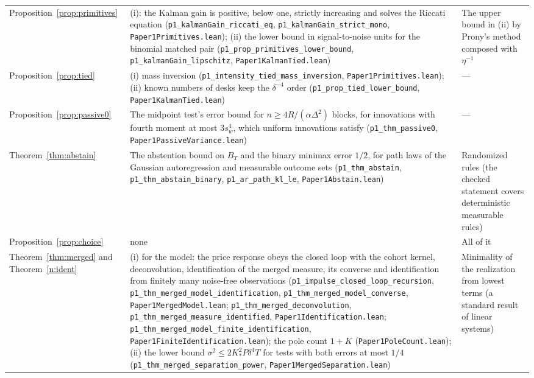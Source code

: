 \documentclass[12pt]{article}
\theoremstyle{definition}
\theoremstyle{remark}
\begin{document}
\begin{longtable}{>{\raggedright\arraybackslash}p{}>{\raggedright\arraybackslash}p{}>{\raggedright\arraybackslash}p{}}
Proposition~\ref{prop:primitives} & (i): the Kalman gain is positive, below one, strictly increasing and solves the Riccati equation (\texttt{p1\_kalmanGain\_riccati\_eq}, \nolinkurl{p1_kalmanGain_strict_mono}, \nolinkurl{Paper1Primitives.lean}); (ii) the lower bound in signal-to-noise units for the binomial matched pair (\nolinkurl{p1_prop_primitives_lower_bound}, \texttt{p1\_kalmanGain\_lipschitz}, \nolinkurl{Paper1KalmanTied.lean}) & The upper bound in (ii) by Prony's method composed with $\eta^{-1}$\\
Proposition~\ref{prop:tied} & (i) mass inversion (\nolinkurl{p1_intensity_tied_mass_inversion}, \nolinkurl{Paper1Primitives.lean}); (ii) known numbers of desks keep the $\delta^{-4}$ order (\texttt{p1\_prop\_tied\_lower\_bound}, \nolinkurl{Paper1KalmanTied.lean}) & ---\\
Proposition~\ref{prop:passive0} & The midpoint test's error bound for $n\ge4R/(\alpha\Delta^2)$ blocks, for innovations with fourth moment at most $3s_w^4$, which uniform innovations satisfy (\texttt{p1\_thm\_passive0}, \nolinkurl{Paper1PassiveVariance.lean}) & ---\\
Theorem~\ref{thm:abstain} & The abstention bound on $B_T$ and the binary minimax error $1/2$, for path laws of the Gaussian autoregression and measurable outcome sets (\texttt{p1\_thm\_abstain}, \texttt{p1\_thm\_abstain\_binary}, \texttt{p1\_ar\_path\_kl\_le}, \nolinkurl{Paper1Abstain.lean}) & Randomized rules (the checked statement covers deterministic measurable rules)\\
Proposition~\ref{prop:choice} & none & All of it\\
Theorem~\ref{thm:merged} and Theorem~\ref{n:ident} & (i) for the model: the price response obeys the closed loop with the cohort kernel, deconvolution, identification of the merged measure, its converse and identification from finitely many noise-free observations (\nolinkurl{p1_impulse_closed_loop_recursion}, \nolinkurl{p1_thm_merged_model_identification}, \nolinkurl{p1_thm_merged_model_converse}, \nolinkurl{Paper1MergedModel.lean}; \nolinkurl{p1_thm_merged_deconvolution}, \nolinkurl{p1_thm_merged_measure_identified}, \nolinkurl{Paper1Identification.lean}; \nolinkurl{p1_thm_merged_model_finite_identification}, \nolinkurl{Paper1FiniteIdentification.lean}); the pole count $1+K$ (\nolinkurl{Paper1PoleCount.lean}); (ii) the lower bound $\sigma^2\le2K_*^2P\delta^4T$ for tests with both errors at most $1/4$ (\nolinkurl{p1_thm_merged_separation_power}, \nolinkurl{Paper1MergedSeparation.lean}) & Minimality of the realization from lowest terms (a standard result of linear systems)\\

\end{longtable}
\end{document}
